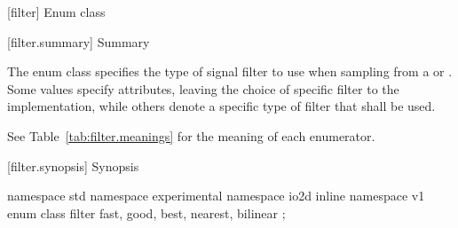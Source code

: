  [filter] {Enum class }

 [filter.summary] { Summary}

\pnum
The  enum class specifies the type of signal filter to use when 
sampling from a  or . Some values specify 
attributes, leaving the choice of specific filter to the implementation, while 
others denote a specific type of filter that shall be used.

\pnum
See Table~\ref{tab:filter.meanings} for the meaning of each
 enumerator.

 [filter.synopsis] { Synopsis}

\begin{codeblock}
namespace std { namespace experimental { namespace io2d { inline namespace v1 {
  enum class filter {
    fast,
    good,
    best,
    nearest,
    bilinear
  };
} } } }
\end{codeblock}

